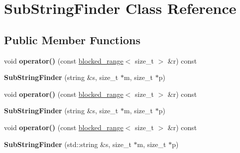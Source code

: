 \hypertarget{classSubStringFinder}{}\section{Sub\+String\+Finder Class Reference}
\label{classSubStringFinder}
\subsection*{Public Member Functions}
\begin{DoxyCompactItemize}
\item 
\hypertarget{classSubStringFinder_aba7a1d9056f51853b752b129d9105ab3}{}void {\bfseries operator()} (const \hyperlink{classtbb_1_1blocked__range}{blocked\+\_\+range}$<$ size\+\_\+t $>$ \&r) const \label{classSubStringFinder_aba7a1d9056f51853b752b129d9105ab3}

\item 
\hypertarget{classSubStringFinder_a9c1c06021772c4d67b712ddfce3991e2}{}{\bfseries Sub\+String\+Finder} (string \&s, size\+\_\+t $\ast$m, size\+\_\+t $\ast$p)\label{classSubStringFinder_a9c1c06021772c4d67b712ddfce3991e2}

\item 
\hypertarget{classSubStringFinder_aba7a1d9056f51853b752b129d9105ab3}{}void {\bfseries operator()} (const \hyperlink{classtbb_1_1blocked__range}{blocked\+\_\+range}$<$ size\+\_\+t $>$ \&r) const \label{classSubStringFinder_aba7a1d9056f51853b752b129d9105ab3}

\item 
\hypertarget{classSubStringFinder_a9c1c06021772c4d67b712ddfce3991e2}{}{\bfseries Sub\+String\+Finder} (string \&s, size\+\_\+t $\ast$m, size\+\_\+t $\ast$p)\label{classSubStringFinder_a9c1c06021772c4d67b712ddfce3991e2}

\item 
\hypertarget{classSubStringFinder_aba7a1d9056f51853b752b129d9105ab3}{}void {\bfseries operator()} (const \hyperlink{classtbb_1_1blocked__range}{blocked\+\_\+range}$<$ size\+\_\+t $>$ \&r) const \label{classSubStringFinder_aba7a1d9056f51853b752b129d9105ab3}

\item 
\hypertarget{classSubStringFinder_a717454e8360a52783eb071d8b89bf542}{}{\bfseries Sub\+String\+Finder} (std\+::string \&s, size\+\_\+t $\ast$m, size\+\_\+t $\ast$p)\label{classSubStringFinder_a717454e8360a52783eb071d8b89bf542}

\end{DoxyCompactItemize}


